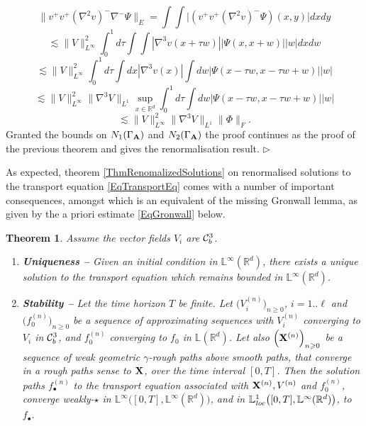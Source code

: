 \documentclass[11pt,a4paper]{amsart}
\newcommand{\RR}{\mathbb{R}}  \newcommand{\CC}{\mathbb{C}}  \newcommand{\LL}{\mathbb{L}}  \newcommand{\WW}{\mathbb{W}}
\renewcommand{\geq}{\geqslant}
\newtheorem{thm}{\hspace{-0.15cm}  {\sc Theorem} } %
\numberwithin{equation}{section} %
\newenvironment{Dem}{%
    \begin{list}{\hspace{0.5cm}{\sc Proof --}}{%
        \setlength{\topsep}{0pt}%
        \setlength{\leftmargin}{0pt}%
        \setlength{\rightmargin}{0pt}%
        \setlength{\listparindent}{0pt}%
        \setlength{\itemindent}{0pt}%
        \setlength{\parsep}{0pt}%
        \addtolength{\leftmargin}{20pt}%
        \addtolength{\rightmargin}{0pt}%
    } \item }{\hfill{\space $\rhd$}\end{list}\smallskip}
\begin{document}
\begin{Dem}
$$
\|v^+ v^+ (\nabla^2 v)^- \nabla^- \Psi\|_E =  \int \int \Big|(v^+ v^+ (\nabla^2 v)^-  \Psi) (x, y) \Big| dx dy  $$
$$
 \lesssim  \|V\|_{L^\infty}^2 \int_0^1 d\tau \int \int |\nabla^3 v(x+\tau w)| |\Psi(x,x+w)| |w| dx dw 
 $$
$$
 \lesssim  \|V\|_{L^\infty}^2 \int_0^1 d\tau \int dx |\nabla^3 v(x)| \int dw  |\Psi(x-\tau w,x-\tau w+w)| |w|
 $$
$$
 \lesssim  \|V\|_{L^\infty}^2 \|\nabla^3 V\|_{L^1} \sup_{x\in\RR^d} \int_0^1 d\tau \int dw  |\Psi(x-\tau w,x-\tau w+w)| |w|
 $$
$$
 \lesssim  \|V\|_{L^\infty}^2 \|\nabla^3 V\|_{L^1}  \|\Phi\|_{F}.
 $$
Granted the bounds on $N_1(\Gamma_{\bf A})$ and $N_2(\Gamma_{\bf A})$ the proof continues as the proof of the previous theorem and gives the renormalisation result.
\end{Dem}
 
\medskip

As expected, theorem \ref{ThmRenomalizedSolutions} on renormalised solutions to the transport equation \eqref{EqTransportEq} comes with a number of important consequences, amongst which is an equivalent of the missing Gronwall lemma, as given by the a priori estimate \eqref{EqGronwall} below.

\begin{thm}
\label{ThmUniqueness} 
Assume the vector fields $V_i$ are $\mathcal{C}^3_b$. \vspace{0.1cm}
\begin{enumerate}
   \item {\bf Uniqueness --} Given an initial condition in $\LL^\infty(\RR^d)$, there exists a unique solution to the transport equation which remains bounded in $\LL^\infty(\RR^d)$.  \vspace{0.2cm}
   \item {\bf Stability --} Let the time horizon $T$ be finite. Let $\Big(V^{(n)}_i\Big)_{n\geq 0}$, $i=1..\ell$ and $\Big(f^{(n)}_0\Big)_{n\geq 0}$ be a sequence of approximating sequences with $V^{(n)}_i$ converging to $V_i$ in $\mathcal{C}^3_b$, and $f^{(n)}_0$ converging to $f_0$ in $\LL(\RR^d)$. Let also $\Big({\bfX}^{(n)}\Big)_{n\geq 0}$ be a sequence of weak geometric $\gamma$-rough paths above smooth paths, that converge in a rough paths sense to ${\bf X}$, over the time interval $[0,T]$. Then the solution paths $f^{(n)}_\bullet$ to the transport equation associated with ${{\bf X}}^{(n)}, V^{(n)}$ and $f^{(n)}_0$, converge weakly-$\star$ in $\LL^\infty\big([0,T],\LL^\infty(\RR^d)\big)$, and in $\LL^1_\textrm{\emph{loc}}\big([0,T],\LL^\infty(\RR^d)\big)$, to $f_\bullet$.
\end{enumerate}
\end{thm}
\end{document}
